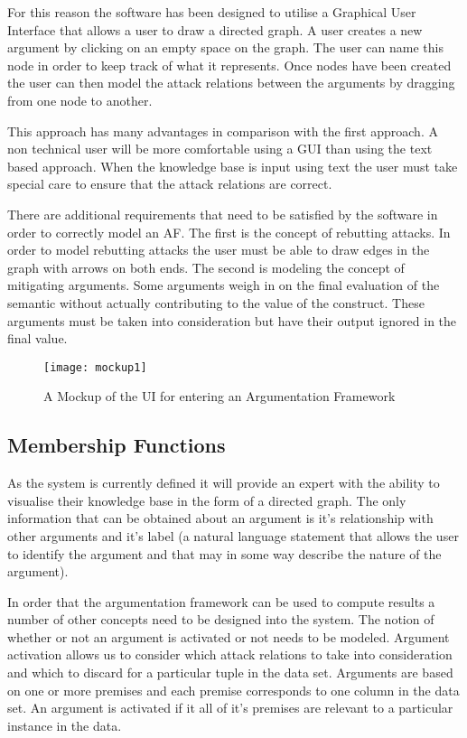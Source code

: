 For this reason the software has been designed to utilise a Graphical User Interface that allows a user to draw a directed graph. A user creates a new argument by clicking on an empty space on the graph. The user can name this node in order to keep track of what it represents. Once nodes have been created the user can then model the attack relations between the arguments by dragging from one node to another.

This approach has many advantages in comparison with the first approach. A non technical user will be more comfortable using a GUI than using the text based approach. When the knowledge base is input using text the user must take special care to ensure that the attack relations are correct.

There are additional requirements that need to be satisfied by the software in order to correctly model an AF. The first is the concept of rebutting attacks. In order to model rebutting attacks the user must be able to draw edges in the graph with arrows on both ends. The second is modeling the concept of mitigating arguments. Some arguments weigh in on the final evaluation of the semantic without actually contributing to the value of the construct. These arguments must be taken into consideration but have their output ignored in the final value. 

\begin{figure}[h]
    \centering
    \texttt{[image: mockup1]}
    \caption{A Mockup of the UI for entering an Argumentation Framework}
    \label{fig:mesh1}
\end{figure}

\subsection{Membership Functions}

As the system is currently defined it will provide an expert with the ability to visualise their knowledge base in the form of a directed graph. The only information that can be obtained about an argument is it's relationship with other arguments and it's label (a natural language statement that allows the user to identify the argument and that may in some way describe the nature of the argument). 

In order that the argumentation framework can be used to compute results a number of other concepts need to be designed into the system. The notion of whether or not an argument is activated or not needs to be modeled. Argument activation allows us to consider which attack relations to take into consideration and which to discard for a particular tuple in the data set. Arguments are based on one or more premises and each premise corresponds to one column in the data set. An argument is activated if it all of it's premises are relevant to a particular instance in the data. 

